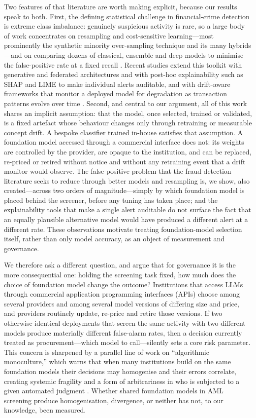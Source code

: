 \documentclass[lineno,pdflatex,sn-basic,Numbered]{sn-jnl}
\begin{document}
Two features of that literature are worth making explicit, because our results speak to both. First, the defining statistical challenge in financial-crime detection is extreme class imbalance: genuinely suspicious activity is rare, so a large body of work concentrates on resampling and cost-sensitive learning---most prominently the synthetic minority over-sampling technique and its many hybrids---and on comparing dozens of classical, ensemble and deep models to minimise the false-positive rate at a fixed recall \cite{smote,imbalance,srfraud1,srfraud2}. Recent studies extend this toolkit with generative and federated architectures and with post-hoc explainability such as SHAP and LIME \cite{shap,lime} to make individual alerts auditable, and with drift-aware frameworks that monitor a deployed model for degradation as transaction patterns evolve over time \cite{srfraud3,srfraud4}. Second, and central to our argument, all of this work shares an implicit assumption: that the model, once selected, trained or validated, is a fixed artefact whose behaviour changes only through retraining or measurable concept drift. A bespoke classifier trained in-house satisfies that assumption. A foundation model accessed through a commercial interface does not: its weights are controlled by the provider, are opaque to the institution, and can be replaced, re-priced or retired without notice and without any retraining event that a drift monitor would observe. The false-positive problem that the fraud-detection literature seeks to reduce through better models and resampling is, we show, also created---across two orders of magnitude---simply by which foundation model is placed behind the screener, before any tuning has taken place; and the explainability tools that make a single alert auditable do not surface the fact that an equally plausible alternative model would have produced a different alert at a different rate. These observations motivate treating foundation-model selection itself, rather than only model accuracy, as an object of measurement and governance.

We therefore ask a different question, and argue that for governance it is the more consequential one: holding the screening task fixed, how much does the choice of foundation model change the outcome? Institutions that access LLMs through commercial application programming interfaces (APIs) choose among several providers and among several model versions of differing size and price, and providers routinely update, re-price and retire those versions. If two otherwise-identical deployments that screen the same activity with two different models produce materially different false-alarm rates, then a decision currently treated as procurement---which model to call---silently sets a core risk parameter. This concern is sharpened by a parallel line of work on ``algorithmic monoculture,'' which warns that when many institutions build on the same foundation models their decisions may homogenise and their errors correlate, creating systemic fragility and a form of arbitrariness in who is subjected to a given automated judgment \cite{monoculture,homogenization,leviathan}. Whether shared foundation models in AML screening produce homogenisation, divergence, or neither has not, to our knowledge, been measured.
\end{document}
